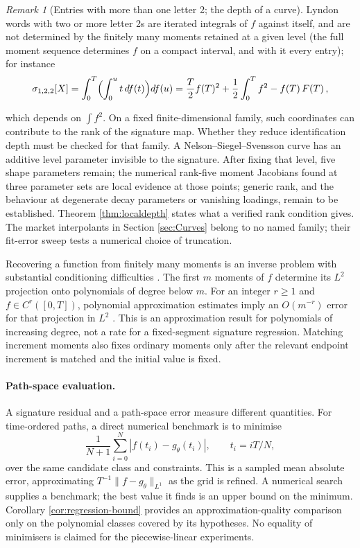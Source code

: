 \documentclass[11pt,english]{article}
\theoremstyle{definition}
\theoremstyle{remark}
\newtheorem{remark}[theorem]{Remark}
\begin{document}
\begin{remark}[Entries with more than one letter 2; the depth of a curve]
\label{rem:nonlinear-core}
Lyndon words with two or more letter 2s are iterated integrals of $f$
against itself, and are not determined by the finitely many moments
retained at a given level (the full moment sequence determines $f$ on
a compact interval, and with it every entry); for instance
\[
\sigma_{1,2,2}[X]=\int_{0}^{T}\Bigl(\int_{0}^{u}t\,df(t)\Bigr)df(u)=\frac{T}{2}f(T)^{2}+\frac{1}{2}\int_{0}^{T}f^{2}-f(T)\,F(T)\,,
\]

which depends on $\int f^2$. On a fixed finite-dimensional family,
such coordinates can contribute to the rank of the signature map.
Whether they reduce identification depth must be checked for that
family. A Nelson--Siegel--Svensson curve has an additive level
parameter invisible to the signature. After fixing that level,
five shape parameters remain; the numerical rank-five moment
Jacobians found at three parameter sets are local evidence at those
points; generic rank, and the behaviour at degenerate decay parameters
or vanishing loadings, remain to be established. Theorem
\ref{thm:localdepth} states what a verified rank condition gives. The
market interpolants in Section \ref{sec:Curves} belong to no named
family; their fit-error sweep tests a numerical choice of truncation.

\end{remark}


Recovering a function from finitely many moments is an inverse
problem with substantial conditioning difficulties \cite{Talenti}.
The first $m$ moments of $f$ determine its $L^2$ projection onto
polynomials of degree below $m$. For an integer $r\ge1$ and
$f\in C^r([0,T])$, polynomial approximation estimates imply an
$O(m^{-r})$ error for that projection in $L^2$
\cite[Chapter 7]{DeVoreLorentz}. This is an approximation result for
polynomials of increasing degree, not a rate for a fixed-segment
signature regression. Matching increment moments also fixes ordinary
moments only after the relevant endpoint increment is matched and
the initial value is fixed.

\paragraph{Path-space evaluation.}
A signature residual and a path-space error measure different
quantities. For time-ordered paths, a direct numerical benchmark is
to minimise
\[
\frac{1}{N+1}\sum_{i=0}^{N}|f(t_i)-g_\theta(t_i)|,
\qquad t_i=iT/N,
\]
over the same candidate class and constraints. This is a sampled
mean absolute error, approximating $T^{-1}\|f-g_\theta\|_{L^1}$
as the grid is refined. A numerical search supplies a benchmark; the
best value it finds is an upper bound on the minimum. Corollary
\ref{cor:regression-bound} provides an approximation-quality
comparison only on the polynomial classes covered by its hypotheses.
No equality of minimisers is claimed for the piecewise-linear
experiments.
\end{document}
